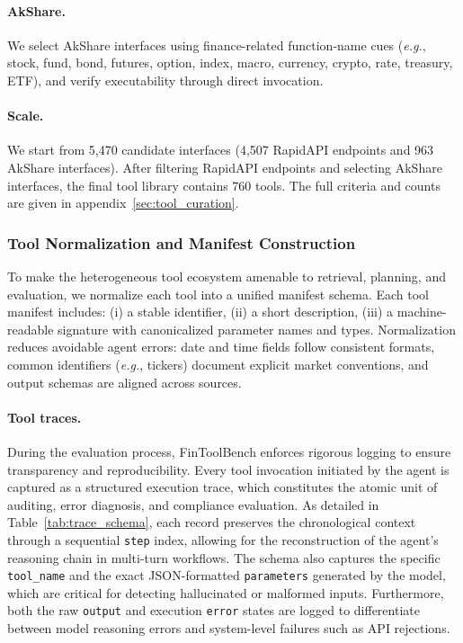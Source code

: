 \documentclass[sigconf,nonacm]{acmart}
\newcommand{\bench}{FinToolBench}
\begin{document}
\paragraph{AkShare.}
We select AkShare interfaces using finance-related function-name cues
(\textit{e.g.}, stock, fund, bond, futures, option, index, macro, currency, crypto, rate, treasury, ETF),
and verify executability through direct invocation.


\paragraph{Scale.}
We start from 5{,}470 candidate interfaces (4{,}507 RapidAPI endpoints and 963 AkShare interfaces).
After filtering RapidAPI endpoints and selecting AkShare interfaces,
the final tool library contains 760 tools.
The full criteria and counts are given in appendix~\ref{sec:tool_curation}.

\subsubsection{Tool Normalization and Manifest Construction}
\label{subsec:normalization}

To make the heterogeneous tool ecosystem amenable to retrieval,
planning, and evaluation, we normalize each tool
into a unified manifest schema.
Each tool manifest includes:
(i) a stable identifier,
(ii) a short description,
(iii) a machine-readable signature with canonicalized parameter names and types.
Normalization reduces avoidable agent errors: date and time fields follow consistent formats,
common identifiers (\textit{e.g.}, tickers) document explicit market conventions,
and output schemas are aligned across sources.

\paragraph{Tool traces.}
During the evaluation process, \bench{} enforces rigorous logging to ensure transparency and reproducibility. Every tool invocation initiated by the agent is captured as a structured execution trace, which constitutes the atomic unit of auditing, error diagnosis, and compliance evaluation. As detailed in Table~\ref{tab:trace_schema}, each record preserves the chronological context through a sequential \texttt{step} index, allowing for the reconstruction of the agent's reasoning chain in multi-turn workflows. The schema also captures the specific \texttt{tool\_name} and the exact JSON-formatted \texttt{parameters} generated by the model, which are critical for detecting hallucinated or malformed inputs. Furthermore, both the raw \texttt{output} and execution \texttt{error} states are logged to differentiate between model reasoning errors and system-level failures such as API rejections.
\end{document}
